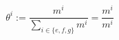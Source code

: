 \begin{equation}
\theta^i := \frac{m^i}{\sum_{i \in \{e,f,g\} }m^i} = \frac{m^i}{m^i}
\end{equation}